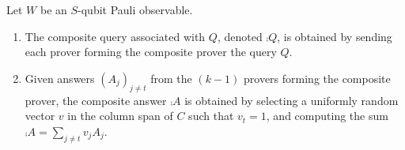 \begin{definition}\label{def:queries}
Let $W$ be an $S$-qubit Pauli observable.
\begin{enumerate}
\item The composite query associated with $Q$, denoted $\comp{Q}$, is
  obtained by sending each prover forming the composite prover the query $Q$.
\item 
Given answers $(A_j)_{j \neq t}$ from the $(k-1)$ provers
  forming the composite prover, the composite answer $\comp{A}$ is
  obtained by selecting a uniformly random vector $v$ in the column
  span of $C$ such that $v_t=1$, and computing the sum $\comp{A} =
  \sum_{j \neq t} v_j A_j$.
\end{enumerate}
\end{definition} 


